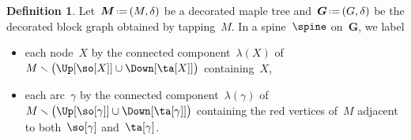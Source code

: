 \documentclass{amsart}
\theoremstyle{definition}
\newtheorem{definition}[theorem]{Definition}
\renewcommand{\b}[1]{{\boldsymbol{#1}}} %
\newcommand{\ssm}{\smallsetminus} %
\newcommand{\eqdef}{\mbox{\,\raisebox{0.2ex}{\scriptsize\ensuremath{\mathrm:}}\ensuremath{=}\,}} %
\newcommand{\decoration}{\delta}
\newcommand{\labeling}{\lambda} %
\begin{document}
\begin{definition}
  \label{def:labeledSpine}
  Let~$\b{M} \eqdef (M, \decoration)$ be a decorated maple tree and~$\b{G} \eqdef (G, \decoration)$ be the decorated block graph obtained by tapping~$M$.
  In a spine~$\spine$ on~$\b{G}$, we label
  \begin{itemize}
    \item each node~$X$ by the connected component~$\labeling(X)$ of~$M \ssm \big( \Up[{\so[X]}] \cup \Down[{\ta[X]}] \big)$ containing~$X$,
    \item each arc~$\gamma$ by the connected component~$\labeling(\gamma)$ of~$M \ssm \big( \Up[{\so[\gamma]}] \cup \Down[{\ta[\gamma]}] \big)$ containing the red vertices of~$M$ adjacent to both~$\so[\gamma]$ and~$\ta[\gamma]$.
  \end{itemize}
\end{definition}
\end{document}
